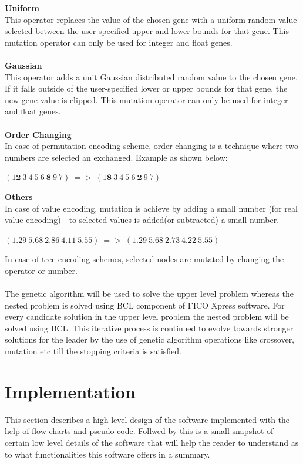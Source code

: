 \documentclass[a4paper, 12pt]{article}
\begin{document}
\textbf{Uniform}\\
This operator replaces the value of the chosen gene with a uniform random value selected between the user-specified upper and lower bounds for that gene. This mutation operator can only be used for integer and float genes.\\~\\
\textbf{Gaussian}\\
This operator adds a unit Gaussian distributed random value to the chosen gene. If it falls outside of the user-specified lower or upper bounds for that gene, the new gene value is clipped. This mutation operator can only be used for integer and float genes.\\~\\
\textbf{Order Changing}\\
In case of permutation encoding scheme, order changing is a technique where two numbers are selected an exchanged. Example as shown below:
\begin{center}
$\left(1 \mathbf{2}\ 3\ 4\ 5\ 6\ \mathbf{8}\ 9\ 7\right)\ =>\ \left(1 \mathbf{8}\ 3\ 4\ 5\ 6\ \mathbf{2}\ 9\ 7\right)$
\end{center}
\textbf{Others}\\
In case of value encoding, mutation is achieve by adding a small number (for real value encoding) - to selected values is added(or subtracted)
a small number.\\
\begin{center}
$(1.29\ 5.68\ 2.86\ 4.11\ 5.55)\ =>\ (1.29\ 5.68\ 2.73\ 4.22\ 5.55)$
\end{center}
In case of tree encoding schemes, selected nodes are mutated by changing the operator or number.\\~\\
The genetic algorithm will be used to solve the upper level problem whereas the nested problem is solved using BCL component of FICO Xpress software. For every candidate solution in the upper level problem the nested problem will be solved using BCL. This iterative process is continued to evolve towards stronger solutions for the leader by the use of genetic algorithm operations like crossover, mutation etc till the stopping criteria is satisfied.%
\newpage
\section{Implementation}
This section describes a high level design of the software implemented with the help of flow charts and pseudo code. Follwed by this is a small snapshot of certain low level details of the software that will help the reader to understand as to what functionalities this software offers in a summary.
\end{document}
